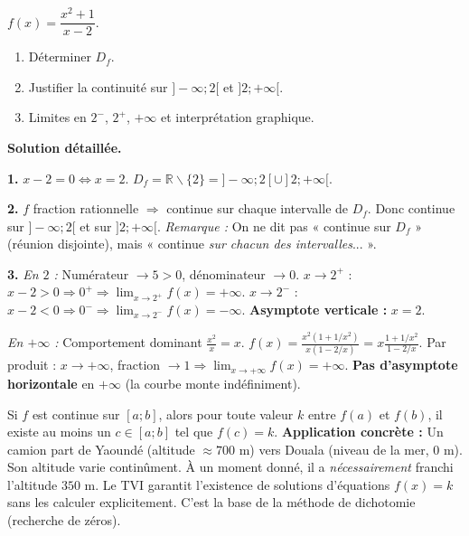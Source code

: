 \documentclass[11pt]{article}
\def\setminus{\mathbin{\backslash}}\let\smallsetminus\setminus
\begin{document}
\begin{exoresolu}
$f(x)=\dfrac{x^2+1}{x-2}$.
\begin{enumerate}
\item Déterminer $D_f$.
\item Justifier la continuité sur $]-\infty;2[$ et $]2;+\infty[$.
\item Limites en $2^-$, $2^+$, $+\infty$ et interprétation graphique.
\end{enumerate}
\tcblower
\textbf{Solution détaillée.}

\textbf{1.} $x-2=0 \iff x=2$. $D_f=\mathbb{R}\setminus\{2\}=]-\infty;2[\cup]2;+\infty[$.

\textbf{2.} $f$ fraction rationnelle $\Rightarrow$ continue sur chaque intervalle de $D_f$.
Donc continue sur $]-\infty;2[$ et sur $]2;+\infty[$.
\textit{Remarque :} On ne dit pas « continue sur $D_f$ » (réunion disjointe), mais « continue \emph{sur chacun des intervalles}... ».

\textbf{3.} \emph{En $2$ :} Numérateur $\to 5>0$, dénominateur $\to 0$.
$x\to 2^+$ : $x-2>0 \Rightarrow 0^+ \Rightarrow \lim_{x\to 2^+}f(x)=+\infty$.
$x\to 2^-$ : $x-2<0 \Rightarrow 0^- \Rightarrow \lim_{x\to 2^-}f(x)=-\infty$.
\textbf{Asymptote verticale :} $x=2$.

\emph{En $+\infty$ :} Comportement dominant $\frac{x^2}{x}=x$.
$f(x)=\frac{x^2(1+1/x^2)}{x(1-2/x)}=x\frac{1+1/x^2}{1-2/x}$.
Par produit : $x\to+\infty$, fraction $\to 1 \Rightarrow \lim_{x\to+\infty}f(x)=+\infty$.
\textbf{Pas d'asymptote horizontale} en $+\infty$ (la courbe monte indéfiniment).
\end{exoresolu}

\begin{savaistu}
Si $f$ est continue sur $[a;b]$, alors pour toute valeur $k$ entre $f(a)$ et $f(b)$, il existe au moins un $c\in[a;b]$ tel que $f(c)=k$.
\textbf{Application concrète :} Un camion part de Yaoundé (altitude $\approx 700$ m) vers Douala (niveau de la mer, $0$ m). Son altitude varie continûment. À un moment donné, il a \emph{nécessairement} franchi l'altitude $350$ m. Le TVI garantit l'existence de solutions d'équations $f(x)=k$ sans les calculer explicitement. C'est la base de la méthode de dichotomie (recherche de zéros).
\end{savaistu}
\end{document}
